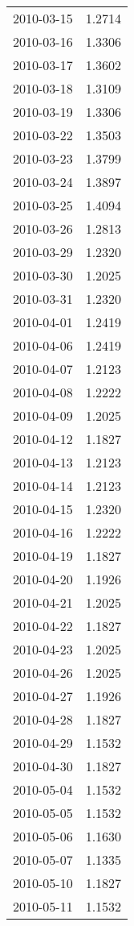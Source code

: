 \begin{tabular}{lr}
2010-03-15 &      1.2714 \\
2010-03-16 &      1.3306 \\
2010-03-17 &      1.3602 \\
2010-03-18 &      1.3109 \\
2010-03-19 &      1.3306 \\
2010-03-22 &      1.3503 \\
2010-03-23 &      1.3799 \\
2010-03-24 &      1.3897 \\
2010-03-25 &      1.4094 \\
2010-03-26 &      1.2813 \\
2010-03-29 &      1.2320 \\
2010-03-30 &      1.2025 \\
2010-03-31 &      1.2320 \\
2010-04-01 &      1.2419 \\
2010-04-06 &      1.2419 \\
2010-04-07 &      1.2123 \\
2010-04-08 &      1.2222 \\
2010-04-09 &      1.2025 \\
2010-04-12 &      1.1827 \\
2010-04-13 &      1.2123 \\
2010-04-14 &      1.2123 \\
2010-04-15 &      1.2320 \\
2010-04-16 &      1.2222 \\
2010-04-19 &      1.1827 \\
2010-04-20 &      1.1926 \\
2010-04-21 &      1.2025 \\
2010-04-22 &      1.1827 \\
2010-04-23 &      1.2025 \\
2010-04-26 &      1.2025 \\
2010-04-27 &      1.1926 \\
2010-04-28 &      1.1827 \\
2010-04-29 &      1.1532 \\
2010-04-30 &      1.1827 \\
2010-05-04 &      1.1532 \\
2010-05-05 &      1.1532 \\
2010-05-06 &      1.1630 \\
2010-05-07 &      1.1335 \\
2010-05-10 &      1.1827 \\
2010-05-11 &      1.1532 \\

\end{tabular}
